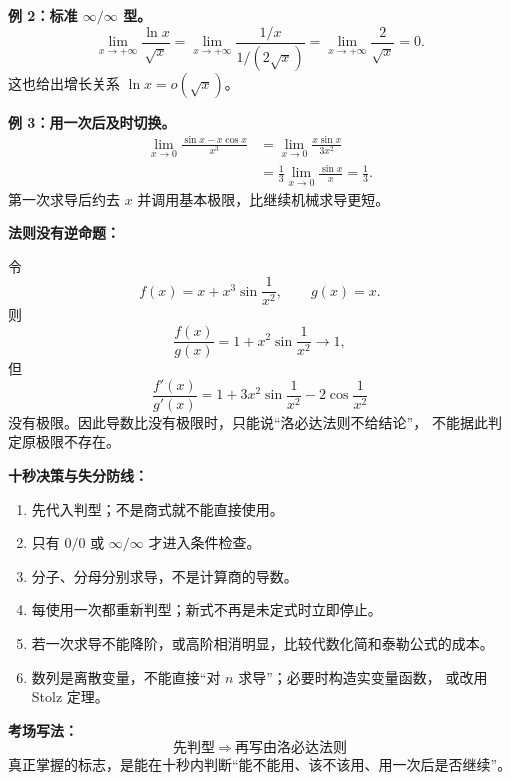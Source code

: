 \begin{knowledgeBox}
\textbf{例 2：标准 \(\infty/\infty\) 型。}
\[
\lim_{x\to+\infty}\frac{\ln x}{\sqrt{x}}
=\lim_{x\to+\infty}
\frac{1/x}{1/(2\sqrt{x})}
=\lim_{x\to+\infty}\frac2{\sqrt{x}}
=0.
\]
这也给出增长关系 \(\ln x=o(\sqrt{x})\)。

\textbf{例 3：用一次后及时切换。}
\[
\begin{aligned}
\lim_{x\to0}\frac{\sin x-x\cos x}{x^3}
&=\lim_{x\to0}\frac{x\sin x}{3x^2}\\
&=\frac13\lim_{x\to0}\frac{\sin x}{x}
=\frac13.
\end{aligned}
\]
第一次求导后约去 \(x\) 并调用基本极限，比继续机械求导更短。

\textbf{法则没有逆命题：}

令
\[
f(x)=x+x^3\sin\frac1{x^2},\qquad g(x)=x.
\]
则
\[
\frac{f(x)}{g(x)}
=1+x^2\sin\frac1{x^2}\to1,
\]
但
\[
\frac{f'(x)}{g'(x)}
=1+3x^2\sin\frac1{x^2}-2\cos\frac1{x^2}
\]
没有极限。因此导数比没有极限时，只能说“洛必达法则不给结论”，
不能据此判定原极限不存在。

\textbf{十秒决策与失分防线：}
\begin{enumerate}
  \item 先代入判型；不是商式就不能直接使用。
  \item 只有 \(0/0\) 或 \(\infty/\infty\) 才进入条件检查。
  \item 分子、分母分别求导，不是计算商的导数。
  \item 每使用一次都重新判型；新式不再是未定式时立即停止。
  \item 若一次求导不能降阶，或高阶相消明显，比较代数化简和泰勒公式的成本。
  \item 数列是离散变量，不能直接“对 \(n\) 求导”；必要时构造实变量函数，
  或改用 Stolz 定理。
\end{enumerate}

\textbf{考场写法：}
\[
\boxed{\text{先判型}\ \Longrightarrow\ \text{再写由洛必达法则}}
\]
真正掌握的标志，是能在十秒内判断“能不能用、该不该用、用一次后是否继续”。
\end{knowledgeBox}

\par

